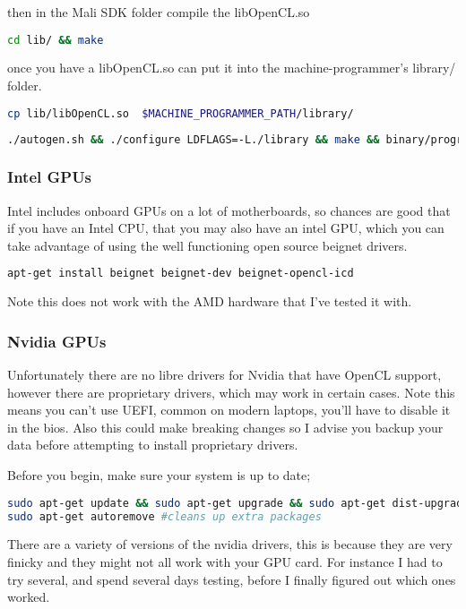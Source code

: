 \documentclass[12pt]{report}
\begin{document}
then in the Mali SDK folder compile the libOpenCL.so
\begin{lstlisting}[language=bash]
cd lib/ && make
\end{lstlisting}
once you have a libOpenCL.so can put it into the machine-programmer's 
library/ folder.
\begin{lstlisting}[language=bash]
cp lib/libOpenCL.so  $MACHINE_PROGRAMMER_PATH/library/
\end{lstlisting}
\begin{lstlisting}[language=bash]
./autogen.sh && ./configure LDFLAGS=-L./library && make && binary/programmer
\end{lstlisting}

\subsubsection{Intel GPUs}
Intel includes onboard GPUs on a lot of motherboards, 
so chances are good that if you have an Intel CPU, that you may also have an
intel GPU, which you can take advantage of using the well functioning open
source beignet drivers.

\begin{lstlisting}[language=bash]
apt-get install beignet beignet-dev beignet-opencl-icd
\end{lstlisting}

Note this does not work with the AMD hardware that I've tested it with.

\subsubsection{Nvidia GPUs}
Unfortunately there are no libre drivers for Nvidia that have OpenCL support,
however there are proprietary drivers, which may work in certain cases. 
Note this means you can't use UEFI, common on modern laptops, you'll have to
disable it in the bios.  Also this could make breaking changes so I advise you
backup your data before attempting to install proprietary drivers. 

Before you begin, make sure your system is up to date;
\begin{lstlisting}[language=bash]
sudo apt-get update && sudo apt-get upgrade && sudo apt-get dist-upgrade;
sudo apt-get autoremove #cleans up extra packages
\end{lstlisting}

There are a variety of versions of the nvidia drivers, this is because they are
very finicky and they might not all work with your GPU card.  For instance I had
to try several, and spend several days testing, before I finally figured out
which ones worked. 
\end{document}
